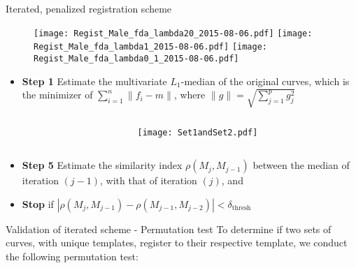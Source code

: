 \documentclass[final]{beamer}
\newlength{\onecolwid}
\begin{document}
\begin{frame}{}
\begin{columns}[t]
\begin{column}{\onecolwid}
\begin{block}{Iterated, penalized registration scheme}
\begin{figure}
          \texttt{[image: Regist\_Male\_fda\_lambda20\_2015-08-06.pdf]}
          \texttt{[image: Regist\_Male\_fda\_lambda1\_2015-08-06.pdf]}
          \texttt{[image: Regist\_Male\_fda\_lambda0\_1\_2015-08-06.pdf]} \\
        \end{figure}
        \begin{itemize}
        \item {\bf{Step 1}} Estimate the multivariate $L_1$-median of the original curves, which is the minimizer of $\sum \limits_{i = 1}^n \|f_i - m \|$, where $\|g \| = \sqrt{\sum\limits_{j=1}^p g_j^2}$
          \begin{columns}
            \begin{column}{0.01\paperwidth}\end{column}			%
            \begin{column}{0.4\textwidth}
              \texttt{[image: Set1andSet2.pdf]}
            \end{column}
          \end{columns}
        \item {\bf{Step 5}} Estimate the similarity index $\rho(M_{j}, M_{j-1})$ between the median of iteration $(j - 1)$, with that of iteration $(j)$, and 
        \item {\bf{Stop}} if $|\rho(M_{j}, M_{j-1}) - \rho(M_{j-1}, M_{j-2})| < \delta_{\text{thresh}}$
        \end{itemize}
      \end{block}
      \begin{block}{Validation of iterated scheme - Permutation test}
        To determine if two sets of curves, with unique templates, register to their respective template, we conduct the following permutation test:

\end{block}
\end{column}
\end{columns}
\end{frame}
\end{document}
